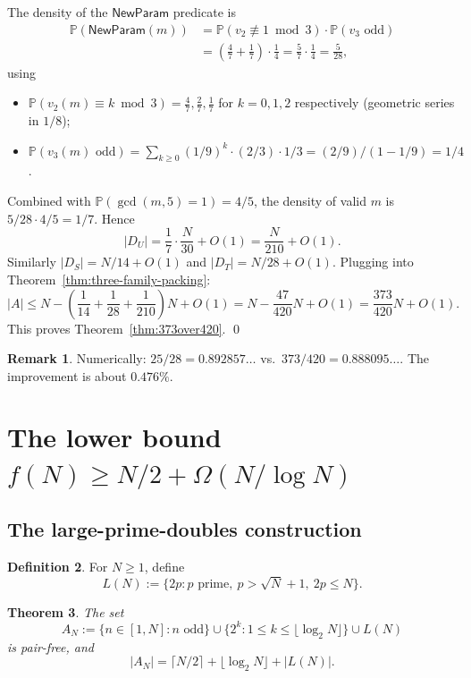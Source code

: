 \documentclass[11pt]{amsart}
\theoremstyle{plain}
\newtheorem{theorem}{Theorem}[section]
\theoremstyle{definition}
\newtheorem{definition}[theorem]{Definition}
\newtheorem{remark}[theorem]{Remark}
\newcommand{\np}{\mathsf{NewParam}}
\begin{document}
The density of the $\np$ predicate is
\begin{align*}
  \mathbb{P}(\np(m)) &= \mathbb{P}(v_2 \not\equiv 1 \bmod 3) \cdot \mathbb{P}(v_3 \text{ odd}) \\
  &= \left(\frac{4}{7} + \frac{1}{7}\right) \cdot \frac{1}{4} = \frac{5}{7} \cdot \frac{1}{4} = \frac{5}{28},
\end{align*}
using
\begin{itemize}
  \item $\mathbb{P}(v_2(m) \equiv k \bmod 3) = \frac{4}{7}, \frac{2}{7}, \frac{1}{7}$ for $k = 0, 1, 2$ respectively (geometric series in $1/8$);
  \item $\mathbb{P}(v_3(m) \text{ odd}) = \sum_{k \geq 0} (1/9)^k \cdot (2/3) \cdot 1/3 = (2/9) / (1 - 1/9) = 1/4$.
\end{itemize}

Combined with $\mathbb{P}(\gcd(m, 5) = 1) = 4/5$, the density of valid $m$ is $5/28 \cdot 4/5 = 1/7$. Hence
\[
  |D_U| = \frac{1}{7} \cdot \frac{N}{30} + O(1) = \frac{N}{210} + O(1).
\]
Similarly $|D_S| = N/14 + O(1)$ and $|D_T| = N/28 + O(1)$. Plugging into Theorem~\ref{thm:three-family-packing}:
\[
  |A| \leq N - \left(\frac{1}{14} + \frac{1}{28} + \frac{1}{210}\right) N + O(1) = N - \frac{47}{420} N + O(1) = \frac{373}{420} N + O(1).
\]
This proves Theorem~\ref{thm:373over420}. \qed

\begin{remark}
Numerically: $25/28 = 0.892857\ldots$ vs.\ $373/420 = 0.888095\ldots$. The improvement is about $0.476\%$.
\end{remark}

\section{The lower bound $f(N) \geq N/2 + \Omega(N/\log N)$}\label{sec:lower}

\subsection{The large-prime-doubles construction}

\begin{definition}
For $N \geq 1$, define
\[
  L(N) := \{2p : p \text{ prime}, \ p > \sqrt{N} + 1, \ 2p \leq N\}.
\]
\end{definition}

\begin{theorem}\label{thm:lower-construction}
The set
\[
  A_N := \{n \in [1, N] : n \text{ odd}\} \cup \{2^k : 1 \leq k \leq \lfloor \log_2 N \rfloor\} \cup L(N)
\]
is pair-free, and
\[
  |A_N| = \lceil N/2 \rceil + \lfloor \log_2 N \rfloor + |L(N)|.
\]
\end{theorem}
\end{document}
